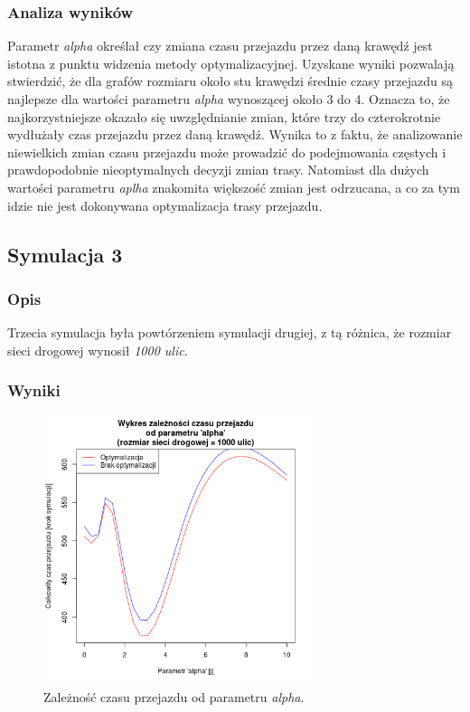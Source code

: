 \documentclass[11pt,a4paper]{article}
\begin{document}
\subsubsection{Analiza wyników}

Parametr \textit{alpha} określał czy zmiana czasu przejazdu przez daną krawędź jest istotna z punktu widzenia metody optymalizacyjnej. Uzyskane wyniki pozwalają stwierdzić, że dla grafów rozmiaru około stu krawędzi średnie czasy przejazdu są najlepsze dla wartości parametru \textit{alpha} wynoszącej około 3 do 4. Oznacza to, że najkorzystniejsze okazało się uwzględnianie zmian, które trzy do czterokrotnie wydłużały czas przejazdu przez daną krawędź. Wynika to z faktu, że analizowanie niewielkich zmian czasu przejazdu może prowadzić do podejmowania częstych i prawdopodobnie nieoptymalnych decyzji zmian trasy. Natomiast dla dużych wartości parametru \textit{aplha} znakomita większość zmian jest odrzucana, a co za tym idzie nie jest dokonywana optymalizacja trasy przejazdu.

\subsection{Symulacja 3}

\subsubsection{Opis}

Trzecia symulacja była powtórzeniem symulacji drugiej, z tą różnica, że rozmiar sieci drogowej wynosił \textit{1000 ulic}.

\subsubsection{Wyniki}



\begin{figure}[H]
	\centering
		\includegraphics[width=0.7\textwidth]{../images/simulation3}
	\caption{Zależność czasu przejazdu od parametru \textit{alpha}.}
\end{figure}
\end{document}
